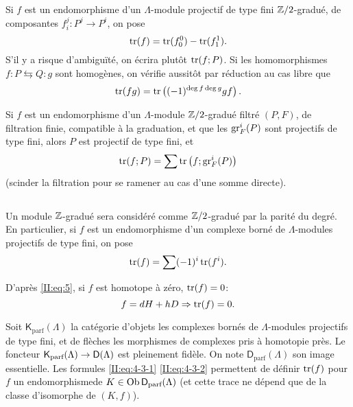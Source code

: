 \documentclass[oneside]{book}
\begin{document}
Si $f$ est un endomorphisme d'un $\Lambda$-module projectif de type fini 
$\mathbb{Z}/2$-gradué, de composantes $f_i^j:P^j\to P^i$, on pose 
\[
  \operatorname{tr}(f) = \operatorname{tr}(f_0^0) - \operatorname{tr}(f_1^1) \text{.}
\]
S'il y a risque d'ambiguïté, on écrira plutôt $\operatorname{tr}(f;P)$. Si les 
homomorphismes $f:P\leftrightarrows Q:g$ sont homogènes, on vérifie 
aussitôt par réduction au cas libre que 
\begin{equation}\label{II:eq:5}
  \operatorname{tr}(f g) = \operatorname{tr}\left((-1)^{\deg f \deg g} g f\right) \text{.}
\end{equation}

Si $f$ est un endomorphisme d'un $\Lambda$-module $\mathbb{Z}/2$-gradué filtré 
$(P,F)$, de filtration finie, compatible à la graduation, et que les 
$\operatorname{gr}_F^i(P)$ sont projectifs de type fini, alors $P$ est projectif de type 
fini, et 
\begin{equation}\label{II:eq:6}
  \operatorname{tr}(f;P) = \sum \operatorname{tr}\left(f; \operatorname{gr}_F^i(P) \right)
\end{equation}
(scinder la filtration pour se ramener au cas d'une somme directe). 





\subsection{}\label{II:4-3}

Un module $\mathbb{Z}$-gradué sera considéré comme $\mathbb{Z}/2$-gradué par la 
parité du degré. En particulier, si $f$ est un endomorphisme d'un complexe 
borné de $\Lambda$-modules projectifs de type fini, on pose 
\begin{equation}\label{II:eq:4-3-1}
  \operatorname{tr}(f) = \sum (-1)^i \operatorname{tr}(f^i) \text{.}
\end{equation}

D'après \eqref{II:eq:5}, si $f$ est homotope à zéro, $\operatorname{tr}(f) = 0$: 
\begin{equation}\label{II:eq:4-3-2}
  f = d H + h D \Rightarrow \operatorname{tr}(f) = 0 \text{.}
\end{equation}

Soit $\mathsf{K}_\text{parf}(\Lambda)$ la catégorie d'objets les complexes 
bornés de $\Lambda$-modules projectifs de type fini, et de flèches les 
morphismes de complexes pris à homotopie près. Le foncteur 
$\mathsf{K}_\text{parf}(\Lambda)\to\mathsf{D}(\Lambda)$ est pleinement fidèle. On note 
$\mathsf{D}_\text{parf}(\Lambda)$ son image essentielle. Les formules 
\eqref{II:eq:4-3-1} \eqref{II:eq:4-3-2} permettent de définir $\operatorname{tr}(f)$ pour $f$ 
un endomorphismede $K\in\operatorname{Ob} \mathsf{D}_\text{parf}(\Lambda)$ (et cette trace ne 
dépend que de la classe d'isomorphe de $(K,f)$). 
\end{document}
